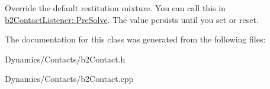 Override the default restitution mixture. You can call this in \mbox{\hyperlink{classb2ContactListener_a416f85eb45a1099053402b15a19a7de0}{b2\+Contact\+Listener\+::\+Pre\+Solve}}. The value persists until you set or reset. 

The documentation for this class was generated from the following files\+:\begin{DoxyCompactItemize}
\item 
Dynamics/\+Contacts/b2\+Contact.\+h\item 
Dynamics/\+Contacts/b2\+Contact.\+cpp\end{DoxyCompactItemize}
